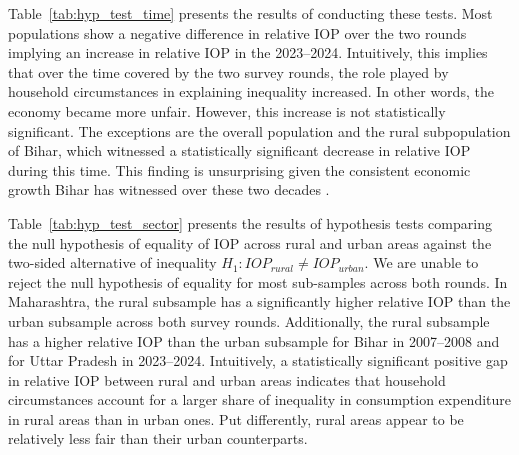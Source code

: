 \documentclass[12pt]{article}
\theoremstyle{plain}
\theoremstyle{definition}
\begin{document}
Table~\ref{tab:hyp_test_time} presents the results of conducting these tests. Most populations show a negative difference in relative IOP over the two rounds implying an increase in relative IOP in the 2023--2024. Intuitively, this implies that over the time covered by the two survey rounds, the role played by household circumstances in explaining inequality increased. In other words, the economy became more unfair. However, this increase is not statistically significant. The exceptions are the overall population and the rural subpopulation of Bihar, which witnessed a statistically significant decrease in relative IOP during this time. This finding is unsurprising given the consistent economic growth Bihar has witnessed over these two decades \citep{Sharma2015}.


Table~\ref{tab:hyp_test_sector} presents the results of hypothesis tests comparing the null hypothesis of equality of IOP across rural and urban areas against the two-sided alternative of inequality $H_{1}: IOP_{rural} \neq IOP_{urban}$. We are unable to reject the null hypothesis of equality for most sub-samples across both rounds. In Maharashtra, the rural subsample has a significantly higher relative IOP than the urban subsample across both survey rounds. Additionally, the rural subsample has a higher relative IOP than the urban subsample for Bihar in 2007--2008 and for Uttar Pradesh in 2023--2024. Intuitively, a statistically significant positive gap in relative IOP between rural and urban areas indicates that household circumstances account for a larger share of inequality in consumption expenditure in rural areas than in urban ones. Put differently, rural areas appear to be relatively less fair than their urban counterparts.
\end{document}
